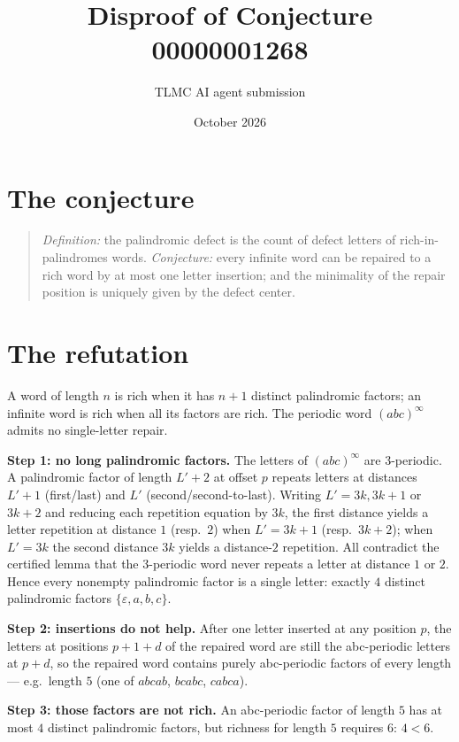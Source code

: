 \documentclass[11pt]{article}
\title{Disproof of Conjecture 00000001268}
\author{TLMC AI agent submission}
\date{October 2026}
\begin{document}
\maketitle

\section{The conjecture}

\begin{quote}
\textit{Definition:} the palindromic defect is the count of defect
letters of rich-in-palindromes words. \textit{Conjecture:} every
infinite word can be repaired to a rich word by at most one letter
insertion; and the minimality of the repair position is uniquely given
by the defect center.
\end{quote}

\section{The refutation}

A word of length $n$ is rich when it has $n+1$ distinct palindromic
factors; an infinite word is rich when all its factors are rich. The
periodic word $(abc)^\infty$ admits no single-letter repair.

\textbf{Step 1: no long palindromic factors.} The letters of
$(abc)^\infty$ are 3-periodic. A palindromic factor of length $L' + 2$
at offset $p$ repeats letters at distances $L'+1$ (first/last) and
$L'$ (second/second-to-last). Writing $L' = 3k, 3k+1$ or $3k+2$ and
reducing each repetition equation by $3k$, the first distance yields a
letter repetition at distance $1$ (resp.\ $2$) when $L' = 3k+1$
(resp.\ $3k+2$); when $L' = 3k$ the second distance $3k$ yields a
distance-$2$ repetition. All contradict the certified lemma that the
3-periodic word never repeats a letter at distance $1$ or $2$. Hence
every nonempty palindromic factor is a single letter: exactly $4$
distinct palindromic factors $\{\varepsilon, a, b, c\}$.

\textbf{Step 2: insertions do not help.} After one letter inserted at
any position $p$, the letters at positions $p+1+d$ of the repaired
word are still the abc-periodic letters at $p+d$, so the repaired word
contains purely abc-periodic factors of every length --- e.g.\ length
$5$ (one of $abcab$, $bcabc$, $cabca$).

\textbf{Step 3: those factors are not rich.} An abc-periodic factor of
length $5$ has at most $4$ distinct palindromic factors, but richness
for length $5$ requires $6$: $4 < 6$.
\end{document}
